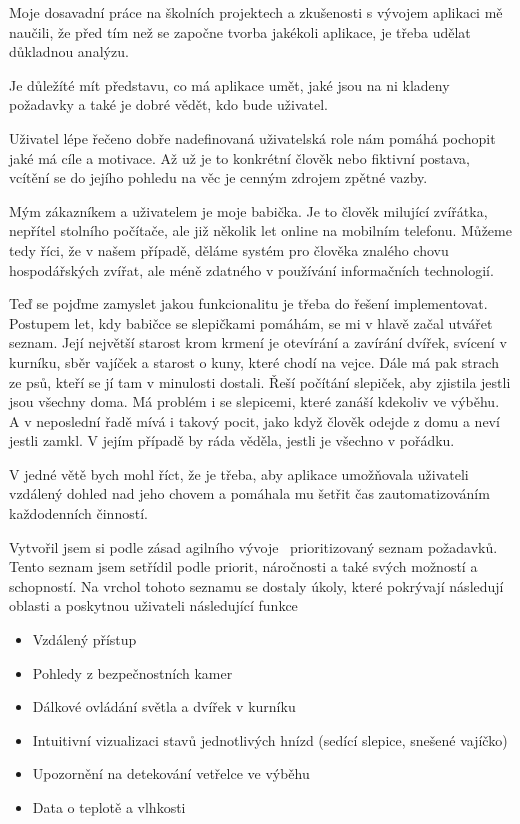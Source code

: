 Moje dosavadní práce na školních projektech a zkušenosti s vývojem aplikaci mě naučili, že před tím než se započne tvorba jakékoli aplikace, je třeba udělat důkladnou analýzu.

Je důležíté mít představu, co má aplikace umět, jaké jsou na ni kladeny požadavky a také je dobré vědět, kdo bude uživatel.

Uživatel lépe řečeno dobře nadefinovaná uživatelská role nám pomáhá pochopit jaké má cíle a motivace.
Až už je to konkrétní člověk nebo fiktivní postava, vcítění se do jejího pohledu na věc je cenným zdrojem zpětné vazby.

Mým zákazníkem a uživatelem je moje babička.
Je to člověk milující zvířátka, nepřítel stolního počítače, ale již několik let online na mobilním telefonu.
Můžeme tedy říci, že v našem případě, děláme systém pro člověka znalého chovu hospodářských zvířat, ale méně zdatného v používání informačních technologií.

Teď se pojďme zamyslet jakou funkcionalitu je třeba do řešení implementovat.
Postupem let, kdy babičce se slepičkami pomáhám, se mi v hlavě začal utvářet seznam.
Její největší starost krom krmení je otevírání a zavírání dvířek, svícení v kurníku, sběr vajíček a starost o kuny, které chodí na vejce.
Dále má pak strach ze psů, kteří se jí tam v minulosti dostali.
Řeší počítání slepiček, aby zjistila jestli jsou všechny doma.
Má problém i se slepicemi, které zanáší kdekoliv ve výběhu.
A v neposlední řadě mívá i takový pocit, jako když člověk odejde z domu a neví jestli zamkl.
V jejím případě by ráda věděla, jestli je všechno v pořádku.

V jedné větě bych mohl říct, že je třeba, aby aplikace umožňovala uživateli vzdálený dohled nad jeho chovem a pomáhala mu šetřit čas zautomatizováním každodenních činností.

Vytvořil jsem si podle zásad agilního vývoje~\cite{agile-manifesto} prioritizovaný seznam požadavků.
Tento seznam jsem setřídil podle priorit, náročnosti a také svých možností a schopností.
Na vrchol tohoto seznamu se dostaly úkoly, které pokrývají následují oblasti a poskytnou uživateli následující funkce

\begin{itemize}
    \item Vzdálený přístup
    \item Pohledy z bezpečnostních kamer
    \item Dálkové ovládání světla a dvířek v kurníku
    \item Intuitivní vizualizaci stavů jednotlivých hnízd (sedící slepice, snešené vajíčko)
    \item Upozornění na detekování vetřelce ve výběhu
    \item Data o teplotě a vlhkosti
\end{itemize}


\newpage